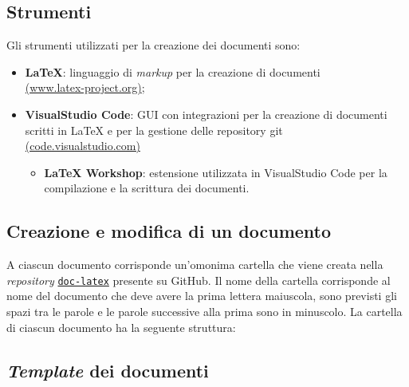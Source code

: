 \subsection{Strumenti}
Gli strumenti utilizzati per la creazione dei documenti sono:
\begin{itemize}
	\item \textbf{LaTeX}: linguaggio di \textit{markup} per la creazione di documenti \\
	      \href{https://www.latex-project.org/}{(www.latex-project.org)};
	\item \textbf{VisualStudio Code}: GUI con integrazioni per la creazione di documenti scritti in LaTeX e per la gestione delle repository git \\
	      \href{https://code.visualstudio.com/}{(code.visualstudio.com)}
	      \begin{itemize}
		      \item \textbf{LaTeX Workshop}: estensione utilizzata in VisualStudio Code per la compilazione e la scrittura dei documenti.
	      \end{itemize}
\end{itemize}


\subsection{Creazione e modifica di un documento}

A ciascun documento corrisponde un'omonima cartella che viene creata nella
\textit{repository}
\href{https://github.com/Project-SWEnergy/doc-latex}{\texttt{doc-latex}}
presente su GitHub. Il nome della cartella corrisponde al nome del documento che
deve avere la prima lettera maiuscola, sono previsti gli spazi tra le parole e
le parole successive alla prima sono in minuscolo.
La cartella di ciascun documento ha la seguente struttura:


\subsection{\textit{Template} dei documenti}

